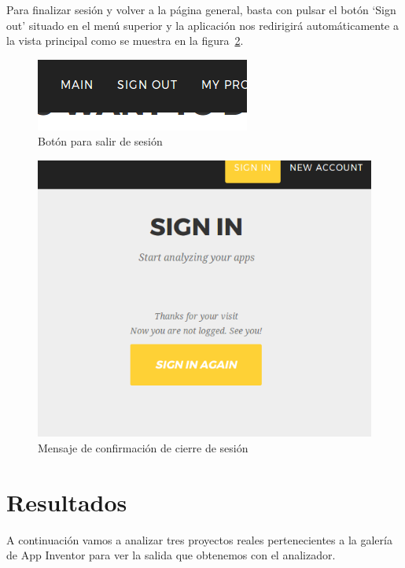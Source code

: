 \documentclass[a4paper, 12pt]{book}
\begin{document}
Para finalizar sesión y volver a la página general, basta con pulsar el botón `Sign out' situado en el menú superior y la aplicación nos redirigirá automáticamente a la vista principal como se muestra en la figura~\ref{fig:logoutOK}.
\begin{figure}[H]
  \centering
  \includegraphics[width=0.50\linewidth, keepaspectratio]{img/logout}
  \caption{Botón para salir de sesión}
  \label{fig:logout}
\end{figure}
\begin{figure}[H]
  \centering
  \includegraphics[width=0.70\linewidth, keepaspectratio]{img/logoutOK}
  \caption{Mensaje de confirmación de cierre de sesión}
  \label{fig:logoutOK}
\end{figure}



\cleardoublepage
\chapter{Resultados}
A continuación vamos a analizar tres proyectos reales pertenecientes a la galería de App Inventor para ver la salida que obtenemos con el analizador.
\end{document}
